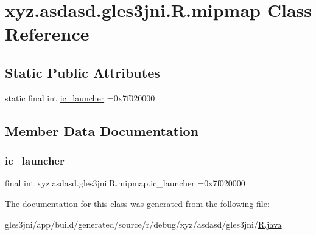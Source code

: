 \hypertarget{classxyz_1_1asdasd_1_1gles3jni_1_1_r_1_1mipmap}{}\section{xyz.\+asdasd.\+gles3jni.\+R.\+mipmap Class Reference}
\label{classxyz_1_1asdasd_1_1gles3jni_1_1_r_1_1mipmap}
\subsection*{Static Public Attributes}
\begin{DoxyCompactItemize}
\item 
static final int \hyperlink{classxyz_1_1asdasd_1_1gles3jni_1_1_r_1_1mipmap_ac732c1585f9942200cad625be0cd8efd}{ic\+\_\+launcher} =0x7f020000
\end{DoxyCompactItemize}


\subsection{Member Data Documentation}
\mbox{\label{classxyz_1_1asdasd_1_1gles3jni_1_1_r_1_1mipmap_ac732c1585f9942200cad625be0cd8efd}} 
\subsubsection{\texorpdfstring{ic\+\_\+launcher}{ic\_launcher}}
{\footnotesize\ttfamily final int xyz.\+asdasd.\+gles3jni.\+R.\+mipmap.\+ic\+\_\+launcher =0x7f020000\hspace{0.3cm}{\ttfamily [static]}}



The documentation for this class was generated from the following file\+:\begin{DoxyCompactItemize}
\item 
gles3jni/app/build/generated/source/r/debug/xyz/asdasd/gles3jni/\hyperlink{_r_8java}{R.\+java}\end{DoxyCompactItemize}
